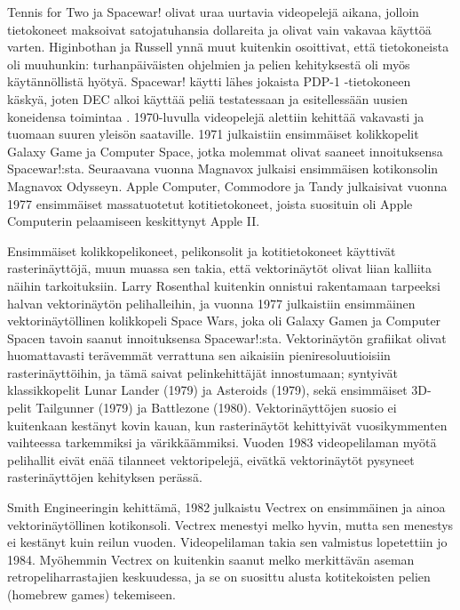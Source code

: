 \documentclass[utf8,bachelor]{gradu3}
\begin{document}
Tennis for Two ja Spacewar! olivat uraa uurtavia videopelejä aikana, jolloin tietokoneet maksoivat satojatuhansia dollareita ja olivat vain vakavaa käyttöä varten. Higinbothan ja Russell ynnä muut kuitenkin osoittivat, että tietokoneista oli muuhunkin: turhanpäiväisten ohjelmien ja pelien kehityksestä oli myös käytännöllistä hyötyä. Spacewar! käytti lähes jokaista PDP-1 -tietokoneen käskyä, joten DEC alkoi käyttää peliä testatessaan ja esitellessään uusien koneidensa toimintaa \parencite{RefWorks:doc:5beac148e4b08968d042364b}. 1970-luvulla videopelejä alettiin kehittää vakavasti ja tuomaan suuren yleisön saataville. 1971 julkaistiin ensimmäiset kolikkopelit Galaxy Game ja Computer Space, jotka molemmat olivat saaneet innoituksensa Spacewar!:sta. Seuraavana vuonna Magnavox julkaisi ensimmäisen kotikonsolin Magnavox Odysseyn. Apple Computer, Commodore ja Tandy julkaisivat vuonna 1977 ensimmäiset massatuotetut kotitietokoneet, joista suosituin oli Apple Computerin pelaamiseen keskittynyt Apple II. \parencite{RefWorks:doc:5be15b13e4b05b9281959f24} %

Ensimmäiset kolikkopelikoneet, pelikonsolit ja kotitietokoneet käyttivät rasterinäyttöjä, muun muassa sen takia, että vektorinäytöt olivat liian kalliita näihin tarkoituksiin. Larry Rosenthal kuitenkin onnistui rakentamaan tarpeeksi halvan vektorinäytön pelihalleihin, ja vuonna 1977 julkaistiin ensimmäinen vektorinäytöllinen kolikkopeli Space Wars, joka oli Galaxy Gamen ja Computer Spacen tavoin saanut innoituksensa Spacewar!:sta. Vektorinäytön grafiikat olivat huomattavasti terävemmät verrattuna sen aikaisiin pieniresoluutioisiin rasterinäyttöihin, ja tämä saivat pelinkehittäjät innostumaan; syntyivät klassikkopelit Lunar Lander (1979) ja Asteroids (1979), sekä ensimmäiset 3D-pelit Tailgunner (1979) ja Battlezone (1980). Vektorinäyttöjen suosio ei kuitenkaan kestänyt kovin kauan, kun rasterinäytöt kehittyivät vuosikymmenten vaihteessa tarkemmiksi ja värikkäämmiksi. Vuoden 1983 videopelilaman myötä pelihallit eivät enää tilanneet vektoripelejä, eivätkä vektorinäytöt pysyneet rasterinäyttöjen kehityksen perässä. \parencite{RefWorks:doc:5be15b13e4b05b9281959f24}

Smith Engineeringin kehittämä, 1982 julkaistu Vectrex on ensimmäinen ja ainoa vektorinäytöllinen kotikonsoli. Vectrex menestyi melko hyvin, mutta sen menestys ei kestänyt kuin reilun vuoden. Videopelilaman takia sen  valmistus lopetettiin jo 1984. Myöhemmin Vectrex on kuitenkin saanut melko merkittävän aseman retropeliharrastajien keskuudessa, ja se on suosittu alusta kotitekoisten pelien (homebrew games) tekemiseen. \parencite{RefWorks:doc:5bed604be4b02374b62fe1b5}
\end{document}
